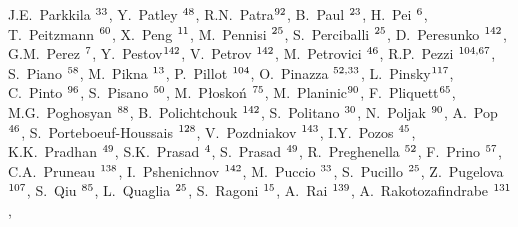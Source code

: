 \begin{flushleft}
J.E.~Parkkila\,\,$^{\rm 33}$, 
Y.~Patley\,\,$^{\rm 48}$, 
R.N.~Patra$^{\rm 92}$, 
B.~Paul\,\,$^{\rm 23}$, 
H.~Pei\,\,$^{\rm 6}$, 
T.~Peitzmann\,\,$^{\rm 60}$, 
X.~Peng\,\,$^{\rm 11}$, 
M.~Pennisi\,\,$^{\rm 25}$, 
S.~Perciballi\,\,$^{\rm 25}$, 
D.~Peresunko\,\,$^{\rm 142}$, 
G.M.~Perez\,\,$^{\rm 7}$, 
Y.~Pestov$^{\rm 142}$, 
V.~Petrov\,\,$^{\rm 142}$, 
M.~Petrovici\,\,$^{\rm 46}$, 
R.P.~Pezzi\,\,$^{\rm 104,67}$, 
S.~Piano\,\,$^{\rm 58}$, 
M.~Pikna\,\,$^{\rm 13}$, 
P.~Pillot\,\,$^{\rm 104}$, 
O.~Pinazza\,\,$^{\rm 52,33}$, 
L.~Pinsky$^{\rm 117}$, 
C.~Pinto\,\,$^{\rm 96}$, 
S.~Pisano\,\,$^{\rm 50}$, 
M.~P\l osko\'{n}\,\,$^{\rm 75}$, 
M.~Planinic$^{\rm 90}$, 
F.~Pliquett$^{\rm 65}$, 
M.G.~Poghosyan\,\,$^{\rm 88}$, 
B.~Polichtchouk\,\,$^{\rm 142}$, 
S.~Politano\,\,$^{\rm 30}$, 
N.~Poljak\,\,$^{\rm 90}$, 
A.~Pop\,\,$^{\rm 46}$, 
S.~Porteboeuf-Houssais\,\,$^{\rm 128}$, 
V.~Pozdniakov\,\,$^{\rm 143}$, 
I.Y.~Pozos\,\,$^{\rm 45}$, 
K.K.~Pradhan\,\,$^{\rm 49}$, 
S.K.~Prasad\,\,$^{\rm 4}$, 
S.~Prasad\,\,$^{\rm 49}$, 
R.~Preghenella\,\,$^{\rm 52}$, 
F.~Prino\,\,$^{\rm 57}$, 
C.A.~Pruneau\,\,$^{\rm 138}$, 
I.~Pshenichnov\,\,$^{\rm 142}$, 
M.~Puccio\,\,$^{\rm 33}$, 
S.~Pucillo\,\,$^{\rm 25}$, 
Z.~Pugelova$^{\rm 107}$, 
S.~Qiu\,\,$^{\rm 85}$, 
L.~Quaglia\,\,$^{\rm 25}$, 
S.~Ragoni\,\,$^{\rm 15}$, 
A.~Rai\,\,$^{\rm 139}$, 
A.~Rakotozafindrabe\,\,$^{\rm 131}$, 

\end{flushleft}
